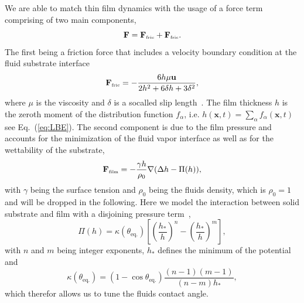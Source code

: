 \documentclass[twocolumn,amsmath,amssymb,showpacs,pre,nofootinbib,superscriptaddress]{revtex4-1} %
\begin{document}
We are able to match thin film dynamics with the usage of a force term comprising of two main components,
\begin{equation}\label{eq:forcesum}
    \mathbf{F} = \mathbf{F}_{\mbox{\tiny{fric}}} + \mathbf{F}_{\mbox{\tiny{fric}}}.
\end{equation}
The first being a friction force that includes a velocity boundary condition at the fluid substrate interface
\begin{equation}\label{eq:forcefric}
\mathbf{F}_{\mbox{\tiny{fric}}} = -\frac{6h\mu\mathbf{u}}{2h^2+6\delta h + 3\delta^2},
\end{equation}
where $\mu$ is the viscosity and $\delta$ is a socalled slip length~\cite{RevModPhys.69.931, PhysRevE.100.033313, PhysRevE.63.011208, munch_lubrication_2005}.
The film thickness $h$ is the zeroth moment of the distribution function $f_{\alpha}$, i.e. $h(\mathbf{x},t) = \sum_{\alpha}f_{\alpha}(\mathbf{x},t)$ see Eq.~(\ref{eq:LBE}). 
The second component is due to the film pressure and accounts for the minimization of the fluid vapor interface as well as for the wettability of the substrate,
\begin{equation}\label{eq:forcefilm}
    \mathbf{F}_{\mbox{\tiny{film}}} = -\frac{\gamma h}{\rho_0}\nabla(\Delta h - \Pi(h)), 
\end{equation}
with $\gamma$ being the surface tension and $\rho_0$ being the fluids density, which is $\rho_0 = 1$ and will be dropped in the following. 
Here we model the interaction between solid substrate and film with a disjoining pressure term~\cite{RevModPhys.69.931, RevModPhys.81.1131, PhysRevE.63.011208},
\begin{equation}\label{eq:disjoinpressure}
    \Pi(h) = \kappa(\theta_{\text{eq.}})\left[\left(\frac{h_{\ast}}{h}\right)^n - \left(\frac{h_{\ast}}{h}\right)^m\right],
\end{equation}
with $n$ and $m$ being integer exponents, $h_{\ast}$ defines the minimum of the potential and  
\begin{equation}\label{eq:kappacontactangle}
    \kappa(\theta_{\text{eq.}}) = (1-\cos\theta_{\text{eq.}}) \frac{(n-1)(m-1)}{(n-m)h_{\ast}},
\end{equation}
which therefor allows us to tune the fluids contact angle.
\end{document}
